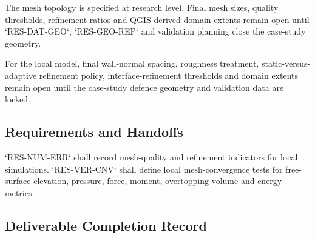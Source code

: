 
The mesh topology is specified at research level. Final mesh sizes,
quality thresholds, refinement ratios and QGIS-derived domain extents
remain open until `RES-DAT-GEO`, `RES-GEO-REP` and validation planning
close the case-study geometry.

For the local model, final wall-normal spacing, roughness treatment,
static-versus-adaptive refinement policy, interface-refinement
thresholds and domain extents remain open until the case-study defence
geometry and validation data are locked.

\subsection{Requirements and Handoffs}
\label{sec:res-num-msh-requirements}


`RES-NUM-ERR` shall record mesh-quality and refinement indicators for
local simulations. `RES-VER-CNV` shall define local mesh-convergence
tests for free-surface elevation, pressure, force, moment, overtopping
volume and energy metrics.

\subsection{Deliverable Completion Record}
\label{sec:res-num-msh-completion-record}

%
%
%
